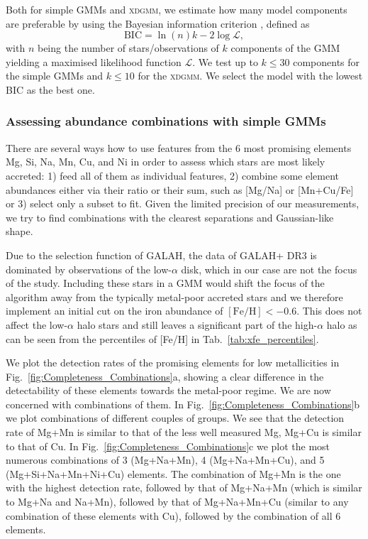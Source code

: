 \documentclass[fleqn,usenatbib]{mnras}
\begin{document}
Both for simple GMMs and \textsc{xdgmm}, we estimate how many model components are preferable by using the Bayesian information criterion \citep[BIC][]{Schwarz1978}, defined as 
\begin{equation}
\text{BIC} = \ln (n) k - 2 \log \mathcal{L},
\end{equation}
with $n$ being the number of stars/observations of $k$ components of the GMM yielding a maximised likelihood function $\mathcal{L}$. We test up to $k \leq 30$ components for the simple GMMs and $k \leq 10$ for the \textsc{xdgmm}. We select the model with the lowest BIC as the best one.

\subsubsection{Assessing abundance combinations with simple GMMs} \label{sec:sample_gmm}

There are several ways how to use features from the 6 most promising elements Mg, Si, Na, Mn, Cu, and Ni in order to assess which stars are most likely accreted: 1) feed all of them as individual features, 2) combine some element abundances either via their ratio or their sum, such as [Mg/Na] or [Mn+Cu/Fe] or 3) select only a subset to fit. Given the limited precision of our measurements, we try to find combinations with the clearest separations and Gaussian-like shape.

Due to the selection function of GALAH, the data of GALAH+ DR3 is dominated by observations of the low-$\alpha$ disk, which in our case are not the focus of the study. Including these stars in a GMM would shift the focus of the algorithm away from the typically metal-poor accreted stars and we therefore implement an initial cut on the iron abundance of $\mathrm{[Fe/H] < -0.6}$. This does not affect the low-$\alpha$ halo stars and still leaves a significant part of the high-$\alpha$ halo as can be seen from the percentiles of [Fe/H] in Tab.~\ref{tab:xfe_percentiles}.

We plot the detection rates of the promising elements for low metallicities in Fig.~\ref{fig:Completeness_Combinations}a, showing a clear difference in the detectability of these elements towards the metal-poor regime. We are now concerned with combinations of them. In Fig.~\ref{fig:Completeness_Combinations}b we plot combinations of different couples of groups. We see that the detection rate of Mg+Mn is similar to that of the less well measured Mg, Mg+Cu is similar to that of Cu. In Fig.~\ref{fig:Completeness_Combinations}c we plot the most numerous combinations of 3 (Mg+Na+Mn), 4 (Mg+Na+Mn+Cu), and 5 (Mg+Si+Na+Mn+Ni+Cu) elements. The combination of Mg+Mn is the one with the highest detection rate, followed by that of Mg+Na+Mn (which is similar to Mg+Na and Na+Mn), followed by that of Mg+Na+Mn+Cu (similar to any combination of these elements with Cu), followed by the combination of all 6 elements.
\end{document}
